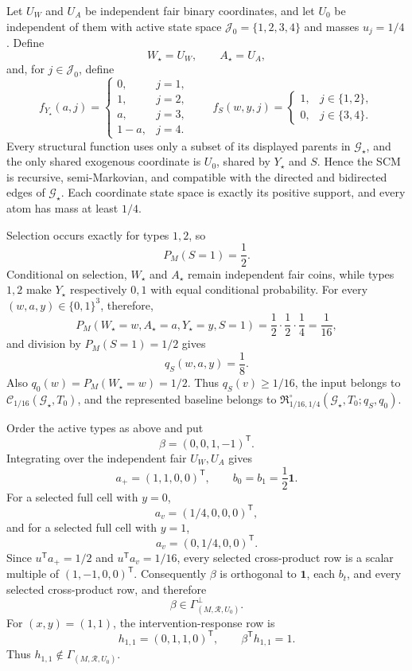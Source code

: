 Let \(U_W\) and \(U_A\) be independent fair binary coordinates, and let \(U_0\) be independent of them with active state space \(\mathcal J_0=\{1,2,3,4\}\) and masses \(u_j=1/4\).  Define
\[
 W_\star=U_W,
 \qquad A_\star=U_A,
\]
and, for \(j\in\mathcal J_0\), define
\[
 f_{Y_\star}(a,j)=
 \begin{cases}
 0,&j=1,\\
 1,&j=2,\\
 a,&j=3,\\
 1-a,&j=4.
 \end{cases}
\qquad
 f_S(w,y,j)=
 \begin{cases}
 1,&j\in\{1,2\},\\
 0,&j\in\{3,4\}.
 \end{cases}
\]
Every structural function uses only a subset of its displayed parents in \(\mathcal G_\star\), and the only shared exogenous coordinate is \(U_0\), shared by \(Y_\star\) and \(S\).  Hence the SCM is recursive, semi-Markovian, and compatible with the directed and bidirected edges of \(\mathcal G_\star\).  Each coordinate state space is exactly its positive support, and every atom has mass at least \(1/4\).

Selection occurs exactly for types \(1,2\), so
\[
 P_M(S=1)=\frac12.
\]
Conditional on selection, \(W_\star\) and \(A_\star\) remain independent fair coins, while types \(1,2\) make \(Y_\star\) respectively \(0,1\) with equal conditional probability.  For every \((w,a,y)\in\{0,1\}^3\), therefore,
\[
 P_M(W_\star=w,A_\star=a,Y_\star=y,S=1)
 =\frac12\cdot\frac12\cdot\frac14=\frac1{16},
\]
and division by \(P_M(S=1)=1/2\) gives
\[
 q_S(w,a,y)=\frac18.
\]
Also \(q_0(w)=P_M(W_\star=w)=1/2\).  Thus \(q_S(v)\geq1/16\), the input belongs to \(\mathcal C_{1/16}(\mathcal G_\star,T_0)\), and the represented baseline belongs to \(\mathfrak R_{1/16,1/4}^{\circ}(\mathcal G_\star,T_0;q_S,q_0)\).

Order the active types as above and put
\[
 \beta=(0,0,1,-1)^{\mathsf T}.
\]
Integrating over the independent fair \(U_W,U_A\) gives
\[
 a_+=(1,1,0,0)^{\mathsf T},
 \qquad b_0=b_1=\frac12\mathbf 1.
\]
For a selected full cell with \(y=0\),
\[
 a_v=(1/4,0,0,0)^{\mathsf T},
\]
and for a selected full cell with \(y=1\),
\[
 a_v=(0,1/4,0,0)^{\mathsf T}.
\]
Since \(u^{\mathsf T}a_+=1/2\) and \(u^{\mathsf T}a_v=1/16\), every selected cross-product row is a scalar multiple of \((1,-1,0,0)^{\mathsf T}\).  Consequently \(\beta\) is orthogonal to \(\mathbf 1\), each \(b_t\), and every selected cross-product row, and therefore
\[
 \beta\in\Gamma_{(M,\mathcal R,U_0)}^\perp.
\]
For \((x,y)=(1,1)\), the intervention-response row is
\[
 h_{1,1}=(0,1,1,0)^{\mathsf T},
 \qquad
 \beta^{\mathsf T}h_{1,1}=1.
\]
Thus \(h_{1,1}\notin\Gamma_{(M,\mathcal R,U_0)}\).


